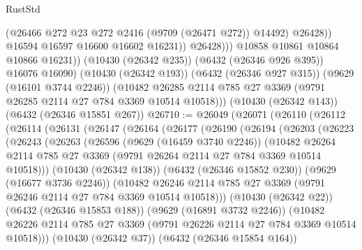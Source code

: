\begin{lexlean}{RustStd}
\begin{coremodule}
                          (@26466 @272 @23 @272 @2416 (@9709 (@26471 @272)) @14492)
                          @26428))
                      @16594
                      @16597
                      @16600
                      @16602
                      @16231))
                  @26428)))
            @10858
            @10861
            @10864
            @10866
            @16231))
        (@10430 (@26342 @235))
        (@6432 (@26346 @926 @395))
        @16076
        @16090)
      (@10430 (@26342 @193))
      (@6432 (@26346 @927 @315))
      (@9629 (@16101 @3744 @2246))
      (@10482 @26285 @2114 @785 @27 @3369 (@9791 @26285 @2114 @27 @784 @3369 @10514 @10518)))
    (@10430 (@26342 @143))
    (@6432 (@26346 @15851 @267))
@26710 := @26049
    (@26071
      (@26110
        (@26112
          (@26114
            (@26131
              (@26147
                (@26164
                  (@26177
                    (@26190
                      (@26194
                        (@26203
                          (@26223
                            (@26243
                              (@26263
                                (@26596
                                  (@9629 (@16459 @3740 @2246))
                                  (@10482
                                    @26264
                                    @2114
                                    @785
                                    @27
                                    @3369
                                    (@9791 @26264 @2114 @27 @784 @3369 @10514 @10518)))
                                (@10430 (@26342 @138))
                                (@6432 (@26346 @15852 @230))
                                (@9629 (@16677 @3736 @2246))
                                (@10482
                                  @26246
                                  @2114
                                  @785
                                  @27
                                  @3369
                                  (@9791 @26246 @2114 @27 @784 @3369 @10514 @10518)))
                              (@10430 (@26342 @22))
                              (@6432 (@26346 @15853 @188))
                              (@9629 (@16891 @3732 @2246))
                              (@10482
                                @26226
                                @2114
                                @785
                                @27
                                @3369
                                (@9791 @26226 @2114 @27 @784 @3369 @10514 @10518)))
                            (@10430 (@26342 @37))
                            (@6432 (@26346 @15854 @164))

\end{coremodule}
\end{lexlean}
